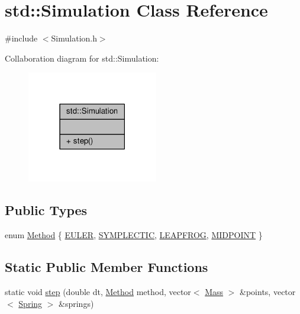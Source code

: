 \hypertarget{classstd_1_1Simulation}{}\section{std\+:\+:Simulation Class Reference}
\label{classstd_1_1Simulation}


{\ttfamily \#include $<$Simulation.\+h$>$}



Collaboration diagram for std\+:\+:Simulation\+:\nopagebreak
\begin{figure}[H]
\begin{center}
\leavevmode
\includegraphics[width=162pt]{classstd_1_1Simulation__coll__graph}
\end{center}
\end{figure}
\subsection*{Public Types}
\begin{DoxyCompactItemize}
\item 
enum \hyperlink{classstd_1_1Simulation_a7cbc16315b54abab3ee481b83d90bf0f}{Method} \{ \hyperlink{classstd_1_1Simulation_a7cbc16315b54abab3ee481b83d90bf0fa21053c5c5a0e88dd4e25f356893b3984}{E\+U\+L\+E\+R}, 
\hyperlink{classstd_1_1Simulation_a7cbc16315b54abab3ee481b83d90bf0fa288a5528e79bb869cfd34673e1182c96}{S\+Y\+M\+P\+L\+E\+C\+T\+I\+C}, 
\hyperlink{classstd_1_1Simulation_a7cbc16315b54abab3ee481b83d90bf0fafe52396efa130f983ce4ab886f04fb49}{L\+E\+A\+P\+F\+R\+O\+G}, 
\hyperlink{classstd_1_1Simulation_a7cbc16315b54abab3ee481b83d90bf0fad2702ad77e7db4ce9edede07636f46db}{M\+I\+D\+P\+O\+I\+N\+T}
 \}
\end{DoxyCompactItemize}
\subsection*{Static Public Member Functions}
\begin{DoxyCompactItemize}
\item 
static void \hyperlink{classstd_1_1Simulation_a0e50b0ce3a31b7ac77cf99b1aa7e3d62}{step} (double dt, \hyperlink{classstd_1_1Simulation_a7cbc16315b54abab3ee481b83d90bf0f}{Method} method, vector$<$ \hyperlink{classMass}{Mass} $>$ \&points, vector$<$ \hyperlink{classSpring}{Spring} $>$ \&springs)
\end{DoxyCompactItemize}


